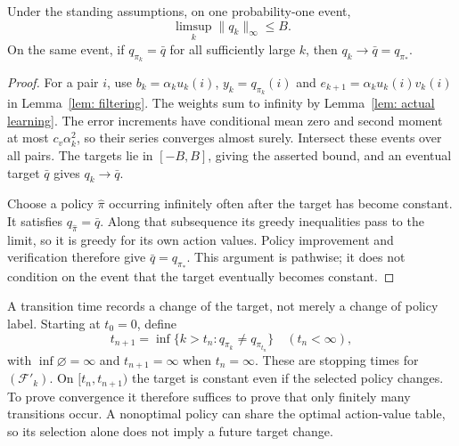 \begin{lemma}\label{thm: bounded limit sets}
Under the standing assumptions, on one probability-one event,
\[
\limsup_k\|q_k\|_\infty\le B.
\]
On the same event, if $q_{\pi_k}=\bar q$ for all sufficiently large $k$, then $q_k\to\bar q=q_{\pi_*}$.
\end{lemma}
\begin{proof}
For a pair $i$, use $b_k=\alpha_k u_k(i)$, $y_k=q_{\pi_k}(i)$ and $e_{k+1}=\alpha_k u_k(i)v_k(i)$ in Lemma~\ref{lem: filtering}. The weights sum to infinity by Lemma~\ref{lem: actual learning}. The error increments have conditional mean zero and second moment at most $c_v\alpha_k^2$, so their series converges almost surely. Intersect these events over all pairs. The targets lie in $[-B,B]$, giving the asserted bound, and an eventual target $\bar q$ gives $q_k\to\bar q$.

Choose a policy $\widehat\pi$ occurring infinitely often after the target has become constant. It satisfies $q_{\widehat\pi}=\bar q$. Along that subsequence its greedy inequalities pass to the limit, so it is greedy for its own action values. Policy improvement and verification therefore give $\bar q=q_{\pi_*}$. This argument is pathwise; it does not condition on the event that the target eventually becomes constant.
\end{proof}

A transition time records a change of the target, not merely a change of policy label. Starting at $t_0=0$, define
\begin{equation}\label{def: transition times}
t_{n+1}=\inf\{k>t_n:q_{\pi_k}\ne q_{\pi_{t_n}}\}\quad(t_n<\infty),
\end{equation}
with $\inf\varnothing=\infty$ and $t_{n+1}=\infty$ when $t_n=\infty$. These are stopping times for $(\mathcal F'_k)$. On $[t_n,t_{n+1})$ the target is constant even if the selected policy changes. To prove convergence it therefore suffices to prove that only finitely many transitions occur. A nonoptimal policy can share the optimal action-value table, so its selection alone does not imply a future target change.
